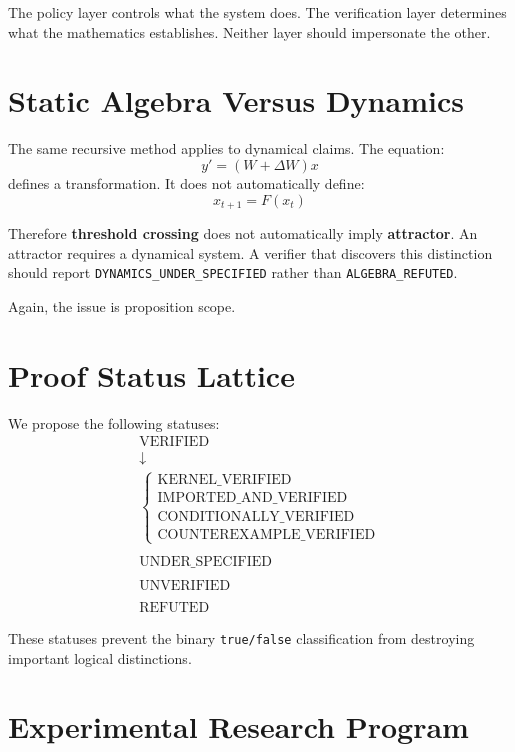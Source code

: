 \documentclass[11pt,a4paper]{article}
\begin{document}
The policy layer controls what the system does. The verification layer determines what the mathematics establishes. Neither layer should impersonate the other.

\section{Static Algebra Versus Dynamics}

The same recursive method applies to dynamical claims. The equation:
\[
y' = (W + \Delta W)x
\]
defines a transformation. It does not automatically define:
\[
x_{t+1} = F(x_t)
\]

Therefore \textbf{threshold crossing} does not automatically imply \textbf{attractor}. An attractor requires a dynamical system. A verifier that discovers this distinction should report \texttt{DYNAMICS\_UNDER\_SPECIFIED} rather than \texttt{ALGEBRA\_REFUTED}.

Again, the issue is proposition scope.

\section{Proof Status Lattice}

We propose the following statuses:
\[
\begin{array}{c}
\text{VERIFIED} \\
\downarrow \\
\left\{\begin{array}{l}
\text{KERNEL\_VERIFIED} \\
\text{IMPORTED\_AND\_VERIFIED} \\
\text{CONDITIONALLY\_VERIFIED} \\
\text{COUNTEREXAMPLE\_VERIFIED}
\end{array}\right. \\
\\
\text{UNDER\_SPECIFIED} \\
\\
\text{UNVERIFIED} \\
\\
\text{REFUTED}
\end{array}
\]

These statuses prevent the binary \texttt{true/false} classification from destroying important logical distinctions.

\section{Experimental Research Program}
\end{document}
